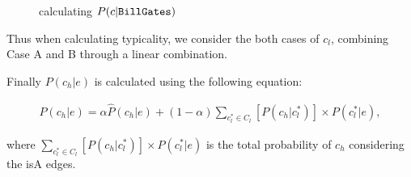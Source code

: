 \begin{figure}[!hptb]
\label{fig:pgge}
\centering
{}%
\caption{calculating $P({c}|{\tt Bill Gates})$ }
\end{figure}

%
Thus when calculating typicality, we consider the both cases of $c_l$, combining Case A and B through a linear combination.

Finally  $P({c_h}|e)$ is calculated using the following equation:

\begin{equation}
\begin{split}
P({c_h}|e) = \alpha \hat{P}({c_h}|e)+ (1-\alpha) \sum_{ c_{l}^*\in C_{l} } [P({c_h}|c_{l}^*) ] \times  P(c_{l}^*|e),
\end{split}
\label{eq:pgge}\end{equation}

where $\sum_{ c_{l}^*\in C_{l} } [P({c_h}|c_{l}^*) ] \times  P(c_{l}^*|e)$ is the total probability of $c_h$ considering the isA edges.


%
%

